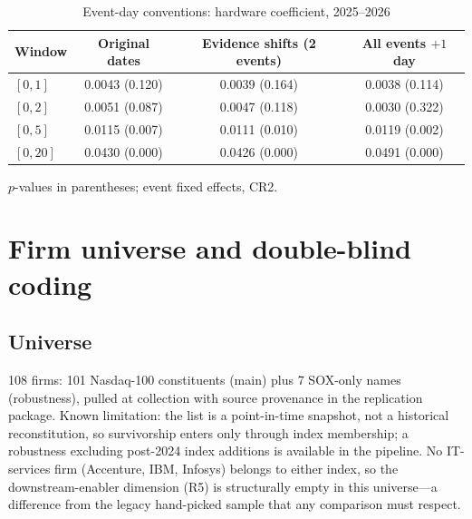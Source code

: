 \documentclass[review,12pt,authoryear]{elsarticle}
\begin{document}
\begin{table}[htbp]
\centering
\caption{Event-day conventions: hardware coefficient, 2025--2026}
\label{tab:app_timing}
\small
\begin{tabular}{lccc}
\toprule
Window & Original dates & Evidence shifts (2 events) & All events $+1$ day \\
\midrule
$[0,1]$  & 0.0043 (0.120) & 0.0039 (0.164) & 0.0038 (0.114) \\
$[0,2]$  & 0.0051 (0.087) & 0.0047 (0.118) & 0.0030 (0.322) \\
$[0,5]$  & 0.0115 (0.007) & 0.0111 (0.010) & 0.0119 (0.002) \\
$[0,20]$ & 0.0430 (0.000) & 0.0426 (0.000) & 0.0491 (0.000) \\
\bottomrule
\end{tabular}

\footnotesize $p$-values in parentheses; event fixed effects, CR2.
\end{table}

\section{Firm universe and double-blind coding}\label{app:coding}

\subsection{Universe}
108 firms: 101 Nasdaq-100 constituents (main) plus 7 SOX-only names
(robustness), pulled at collection with source provenance in
the replication package. Known limitation: the list
is a point-in-time snapshot, not a historical reconstitution, so
survivorship enters only through index membership; a robustness excluding
post-2024 index additions is available in the pipeline. No IT-services firm
(Accenture, IBM, Infosys) belongs to either index, so the downstream-enabler
dimension (R5) is structurally empty in this universe---a difference from
the legacy hand-picked sample that any comparison must respect.
\end{document}
